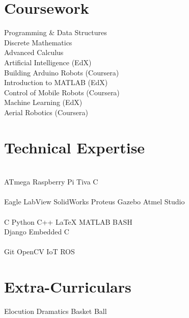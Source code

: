 \documentclass[letterpaper]{akhilesh}
\begin{document}
\begin{minipage}[t]{0.39\textwidth}

\section{Coursework}
Programming \& Data Structures\\
Discrete Mathematics \\
Advanced Calculus \\
Artificial Intelligence (EdX)\\
Building Arduino Robots (Coursera)\\
Introduction to MATLAB (EdX)\\
Control of Mobile Robots (Coursera)\\
Machine Learning (EdX)\\
Aerial Robotics (Coursera)
\sectionsep



\section{Technical Expertise}
\\
ATmega \textbullet{} Raspberry Pi \textbullet{} Tiva C\\
{}\\
Eagle \textbullet{} LabView \textbullet{} SolidWorks \textbullet{} Proteus  Gazebo \textbullet{} Atmel Studio\\
{}\\
 C  \textbullet{} Python \textbullet{} C++ \textbullet{} \LaTeX  \textbullet{} MATLAB \textbullet{} BASH\\Django \textbullet{} Embedded C\\
{}\\
Git \textbullet{} OpenCV \textbullet{} IoT \textbullet{} ROS\\
\sectionsep



\section{Extra-Curriculars}  
Elocution \textbullet{} Dramatics \textbullet{} Basket Ball\\
\sectionsep


\end{minipage} 
\hfill
\end{document}

